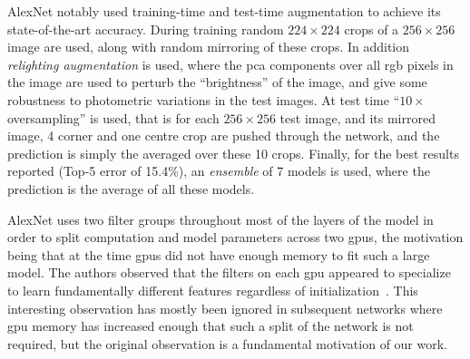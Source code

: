 \documentclass[thesis]{subfiles}
\begin{document}
AlexNet notably used training-time and test-time augmentation to achieve its state-of-the-art accuracy. During training random $224 \times 224$ crops of a $256 \times 256$ image are used, along with random mirroring of these crops. In addition \emph{relighting augmentation} is used, where the \gls{pca} components over all \gls{rgb} pixels in the image are used to perturb the ``brightness'' of the image, and give some robustness to photometric variations in the test images. At test time ``$10\times$ oversampling'' is used, that is for each $256\times 256$ test image, and its mirrored image, 4 corner and one centre crop are pushed through the network, and the prediction is simply the averaged over these 10 crops. Finally, for the best results reported (Top-5 error of 15.4\%), an \emph{ensemble} of 7 models is used, where the prediction is the average of all these models. 

AlexNet uses two filter groups throughout most of the layers of the model in order to split computation and model parameters across two \gls{gpu}s, the motivation being that at the time \gls{gpu}s did not have enough memory to fit such a large model. The authors observed that the filters on each \gls{gpu} appeared to specialize to learn fundamentally different features regardless of initialization~\citep{Krizhevsky2012}. This interesting observation has mostly been ignored in subsequent networks where \gls{gpu} memory has increased enough that such a split of the network is not required, but the original observation is a fundamental motivation of our work.
\end{document}
